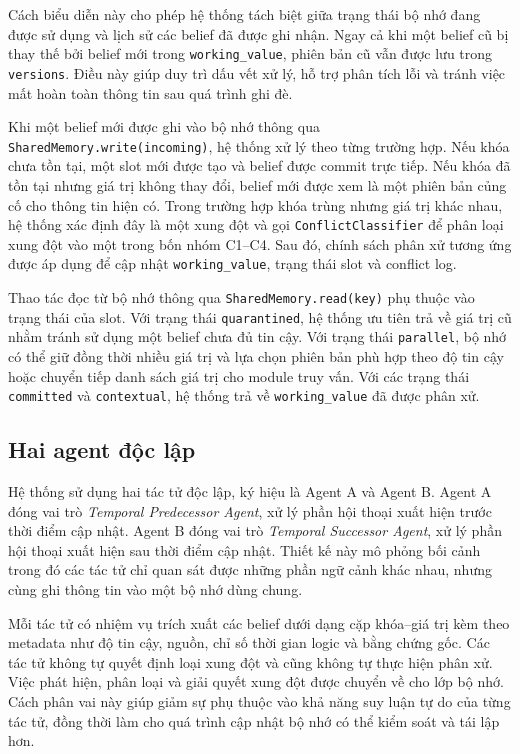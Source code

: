 \documentclass[12pt,a4paper]{article}
\newcommand{\code}[1]{\texttt{#1}}
\begin{document}
Cách biểu diễn này cho phép hệ thống tách biệt giữa trạng thái bộ nhớ đang được sử dụng và lịch sử các belief đã được ghi nhận. Ngay cả khi một belief cũ bị thay thế bởi belief mới trong \code{working\_value}, phiên bản cũ vẫn được lưu trong \code{versions}. Điều này giúp duy trì dấu vết xử lý, hỗ trợ phân tích lỗi và tránh việc mất hoàn toàn thông tin sau quá trình ghi đè.

Khi một belief mới được ghi vào bộ nhớ thông qua \code{SharedMemory.write(incoming)}, hệ thống xử lý theo từng trường hợp. Nếu khóa chưa tồn tại, một slot mới được tạo và belief được commit trực tiếp. Nếu khóa đã tồn tại nhưng giá trị không thay đổi, belief mới được xem là một phiên bản củng cố cho thông tin hiện có. Trong trường hợp khóa trùng nhưng giá trị khác nhau, hệ thống xác định đây là một xung đột và gọi \code{ConflictClassifier} để phân loại xung đột vào một trong bốn nhóm C1--C4. Sau đó, chính sách phân xử tương ứng được áp dụng để cập nhật \code{working\_value}, trạng thái slot và conflict log.

Thao tác đọc từ bộ nhớ thông qua \code{SharedMemory.read(key)} phụ thuộc vào trạng thái của slot. Với trạng thái \code{quarantined}, hệ thống ưu tiên trả về giá trị cũ nhằm tránh sử dụng một belief chưa đủ tin cậy. Với trạng thái \code{parallel}, bộ nhớ có thể giữ đồng thời nhiều giá trị và lựa chọn phiên bản phù hợp theo độ tin cậy hoặc chuyển tiếp danh sách giá trị cho module truy vấn. Với các trạng thái \code{committed} và \code{contextual}, hệ thống trả về \code{working\_value} đã được phân xử.

\subsection{Hai agent độc lập}

Hệ thống sử dụng hai tác tử độc lập, ký hiệu là Agent A và Agent B. Agent A đóng vai trò \textit{Temporal Predecessor Agent}, xử lý phần hội thoại xuất hiện trước thời điểm cập nhật. Agent B đóng vai trò \textit{Temporal Successor Agent}, xử lý phần hội thoại xuất hiện sau thời điểm cập nhật. Thiết kế này mô phỏng bối cảnh trong đó các tác tử chỉ quan sát được những phần ngữ cảnh khác nhau, nhưng cùng ghi thông tin vào một bộ nhớ dùng chung.

Mỗi tác tử có nhiệm vụ trích xuất các belief dưới dạng cặp khóa--giá trị kèm theo metadata như độ tin cậy, nguồn, chỉ số thời gian logic và bằng chứng gốc. Các tác tử không tự quyết định loại xung đột và cũng không tự thực hiện phân xử. Việc phát hiện, phân loại và giải quyết xung đột được chuyển về cho lớp bộ nhớ. Cách phân vai này giúp giảm sự phụ thuộc vào khả năng suy luận tự do của từng tác tử, đồng thời làm cho quá trình cập nhật bộ nhớ có thể kiểm soát và tái lập hơn.
\end{document}
